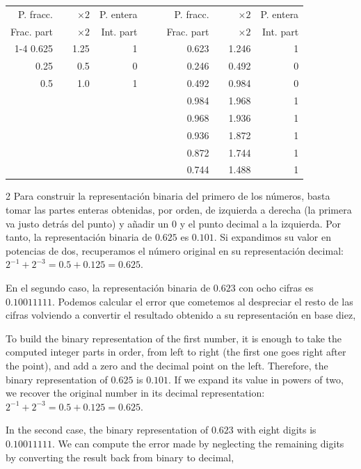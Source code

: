 \begin{table}[h]
	\centering
\begin{tabular}{|r|r|r|r|r r|r|r|r|r|}
P. fracc.& &$\times 2$& P. entera& &&P. fracc.& &$\times 2$& P. entera\\
Frac. part& &$\times 2$&Int. part& && Frac. part& &$\times 2$& Int. part\\
\cline{1-4}
\cline{7-10}
0.625& &1.25&1& &&0.623& &1.246&1\\
0.25  & &0.5  &0& &&0.246& &0.492&0\\
0.5    & &1.0  &1& &&0.492& &0.984&0\\
         & &       &  & &&0.984& &1.968&1\\
         & &       &  & &&0.968& &1.936&1\\
         & &       &  & &&0.936& &1.872&1\\
         & &       &  & &&0.872& &1.744&1\\
         & &       &  & &&0.744& &1.488&1\\
\end{tabular}
\end{table}
\begin{paracol}{2}
Para construir la representación binaria del primero de los números, basta tomar las partes enteras obtenidas, por orden, de izquierda a derecha (la primera va justo detrás del punto) y añadir un $0$ y el punto decimal a la izquierda. Por tanto, la representación binaria de $0.625$ es $0.101$. Si expandimos su valor en potencias de dos, recuperamos el número original en su representación decimal: $2^{-1}+2^{-3}=0.5+0.125=0.625$.

En el segundo caso, la representación binaria de $0.623$ con ocho cifras es $0.10011111$. Podemos calcular el error que cometemos al despreciar el resto de las cifras volviendo a convertir el resultado obtenido a su representación en base diez,

 \switchcolumn
To build the binary representation of the first number, it is enough to take the computed integer parts in order, from left to right (the first one goes right after the point), and add a zero and the decimal point on the left. Therefore, the binary representation of $0.625$ is $0.101$. If we expand its value in powers of two, we recover the original number in its decimal representation: $2^{-1}+2^{-3}=0.5+0.125=0.625$.

In the second case, the binary representation of $0.623$ with eight digits is $0.10011111$. We can compute the error made by neglecting the remaining digits by converting the result back from binary to decimal,

\end{paracol}
